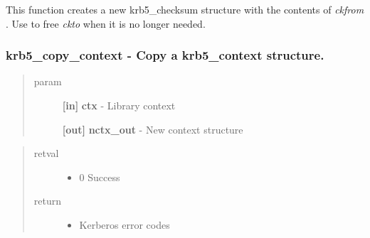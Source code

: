 \documentclass[letterpaper,10pt,english]{sphinxmanual}
\begin{document}
This function creates a new krb5\_checksum structure with the contents of \emph{ckfrom} . Use {\hyperref[appdev/refs/api/krb5_free_checksum:c.krb5_free_checksum]{}} to free \emph{ckto} when it is no longer needed.


\subsubsection{krb5\_copy\_context -  Copy a krb5\_context structure.}
\label{appdev/refs/api/krb5_copy_context:krb5-copy-context-copy-a-krb5-context-structure}\label{appdev/refs/api/krb5_copy_context::doc}

\begin{fulllineitems}
\label{appdev/refs/api/krb5_copy_context:c.krb5_copy_context}
\end{fulllineitems}

\begin{quote}\begin{description}
\item[{param}] \leavevmode
\textbf{{[}in{]}} \textbf{ctx} - Library context

\textbf{{[}out{]}} \textbf{nctx\_out} - New context structure

\end{description}\end{quote}
\begin{quote}\begin{description}
\item[{retval}] \leavevmode\begin{itemize}
\item {} 
0   Success

\end{itemize}

\item[{return}] \leavevmode\begin{itemize}
\item {} 
Kerberos error codes

\end{itemize}

\end{description}\end{quote}
\end{document}
